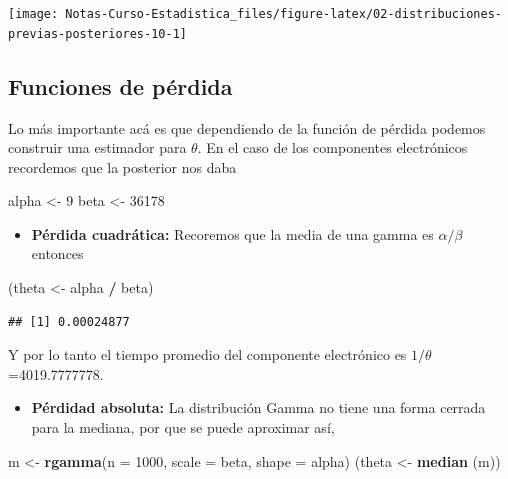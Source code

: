 \documentclass[
  12pt,
]{book}
\newenvironment{Shaded}{\begin{snugshade}}{\end{snugshade}}
\newcommand{\DataTypeTok}[1]{\textcolor[rgb]{0.13,0.29,0.53}{#1}}
\newcommand{\DecValTok}[1]{\textcolor[rgb]{0.00,0.00,0.81}{#1}}
\newcommand{\KeywordTok}[1]{\textcolor[rgb]{0.13,0.29,0.53}{\textbf{#1}}}
\newcommand{\NormalTok}[1]{#1}
\newcommand{\OperatorTok}[1]{\textcolor[rgb]{0.81,0.36,0.00}{\textbf{#1}}}
\newcommand{\StringTok}[1]{\textcolor[rgb]{0.31,0.60,0.02}{#1}}
\providecommand{\tightlist}{%
  \setlength{\itemsep}{0pt}\setlength{\parskip}{0pt}}
\begin{document}
\begin{center}\texttt{[image: Notas-Curso-Estadistica\_files/figure-latex/02-distribuciones-previas-posteriores-10-1]} \end{center}

\hypertarget{funciones-de-puxe9rdida-1}{%
\subsection{Funciones de pérdida}\label{funciones-de-puxe9rdida-1}}

Lo más importante acá es que dependiendo de la función de pérdida podemos construir una estimador para \(\theta\). En el caso de los componentes electrónicos recordemos que la posterior nos daba

\begin{Shaded}
\begin{Highlighting}[]
\NormalTok{alpha \textless{}{-}}\StringTok{ }\DecValTok{9}
\NormalTok{beta \textless{}{-}}\StringTok{ }\DecValTok{36178}
\end{Highlighting}
\end{Shaded}

\begin{itemize}
\tightlist
\item
  \textbf{Pérdida cuadrática:} Recoremos que la media de una gamma es \(\alpha/\beta\) entonces
\end{itemize}

\begin{Shaded}
\begin{Highlighting}[]
\NormalTok{(theta \textless{}{-}}\StringTok{ }\NormalTok{alpha }\OperatorTok{/}\StringTok{ }\NormalTok{beta)}
\end{Highlighting}
\end{Shaded}

\begin{verbatim}
## [1] 0.00024877
\end{verbatim}

Y por lo tanto el tiempo promedio del componente electrónico es \(1/\theta\)=4019.7777778.

\begin{itemize}
\tightlist
\item
  \textbf{Pérdidad absoluta:} La distribución Gamma no tiene una forma cerrada para la mediana, por que se puede aproximar así,
\end{itemize}

\begin{Shaded}
\begin{Highlighting}[]
\NormalTok{m \textless{}{-}}\StringTok{ }\KeywordTok{rgamma}\NormalTok{(}\DataTypeTok{n =} \DecValTok{1000}\NormalTok{, }\DataTypeTok{scale =}\NormalTok{ beta, }\DataTypeTok{shape =}\NormalTok{ alpha)}
\NormalTok{(theta \textless{}{-}}\StringTok{ }\KeywordTok{median}\NormalTok{ (m))}
\end{Highlighting}
\end{Shaded}
\end{document}
